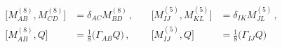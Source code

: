 \begin{equation}
\label{e:trivialstuff}
\begin{aligned}
\big[M^{(8)}_{AB}, M^{(8)}_{CD}\big] &= 
  \delta_{AC} M^{(8)}_{BD}\, , \quad&
\big[M^{(5)}_{IJ}, M^{(5)}_{KL}\big] &= 
  \delta_{IK} M^{(5)}_{JL}\, ,\\
{}\big[M^{(8)}_{AB}, Q\big] &= 
  \frac{1}{8}\big(\Gamma_{AB} Q\big)\, , &
{}\big[M^{(5)}_{IJ}, Q\big] &= 
  \frac{1}{8}\big(\Gamma_{IJ} Q\big)
\end{aligned}
\end{equation}


